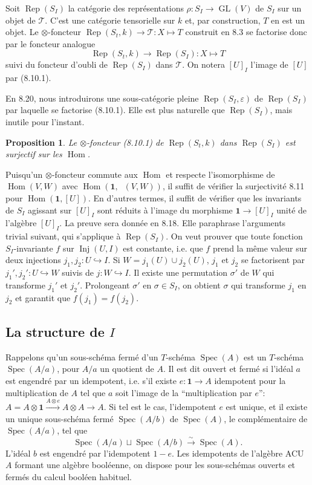 \documentclass[11pt,a4paper]{article}
\theoremstyle{plain}
\newtheorem{proposition}[theorem]{Proposition}
\theoremstyle{definition}
\DeclareMathOperator{\Hom}{Hom}
\DeclareMathOperator{\Spec}{Spec}
\DeclareMathOperator{\Rep}{Rep}
\DeclareMathOperator{\Inj}{Inj}
\DeclareMathOperator{\GL}{GL}
\newcommand{\eps}{\varepsilon}
\newcommand{\isom}{\xrightarrow{\sim}}
\newcommand{\inj}{\hookrightarrow}
\DeclareMathOperator{\iHom}{\underline{Hom}}
\begin{document}
Soit $\Rep(S_I)$ la cat\'egorie des repr\'esentations $\rho : S_I \to \GL(V)$ de $S_I$ sur un objet de $\mathcal{T}$. C'est une cat\'egorie tensorielle sur $k$ et, par construction, $T$ en est un objet. Le $\otimes$-foncteur $\Rep(S_t, k) \to \mathcal{T} : X \longmapsto T$ construit en 8.3 se factorise donc par le foncteur analogue
\begin{equation}
\Rep(S_t, k) \to \Rep(S_I) : X \longmapsto T \tag{8.10.1}
\end{equation}
suivi du foncteur d'oubli de $\Rep(S_I)$ dans $\mathcal{T}$. On notera $[U]_I$ l'image de $[U]$ par (8.10.1).

En 8.20, nous introduirons une sous-cat\'egorie pleine $\Rep(S_I, \eps)$ de $\Rep(S_I)$ par laquelle se factorise (8.10.1). Elle est plus naturelle que $\Rep(S_I)$, mais inutile pour l'instant.

\begin{proposition}
Le $\otimes$-foncteur (8.10.1) de $\Rep(S_t, k)$ dans $\Rep(S_I)$ est surjectif sur les $\Hom$.
\end{proposition}

Puisqu'un $\otimes$-foncteur commute aux $\Hom$ et respecte l'isomorphisme de $\Hom(V, W)$ avec $\Hom(\mathbf{1}, \iHom(V, W))$, il suffit de v\'erifier la surjectivit\'e 8.11 pour $\Hom(\mathbf{1}, [U])$. En d'autres termes, il suffit de v\'erifier que les invariants de $S_I$ agissant sur $[U]_I$ sont r\'eduits \`a l'image du morphisme $\mathbf{1} \to [U]_I$ unit\'e de l'alg\`ebre $[U]_I$. La preuve sera donn\'ee en 8.18. Elle paraphrase l'arguments trivial suivant, qui s'applique \`a $\Rep(S_I)$. On veut prouver que toute fonction $S_I$-invariante $f$ sur $\Inj(U, I)$ est constante, i.e. que $f$ prend la m\^eme valeur sur deux injections $j_1, j_2 : U \inj I$. Si $W = j_1(U) \cup j_2(U)$, $j_1$ et $j_2$ se factorisent par $j_1', j_2' : U \inj W$ suivis de $j : W \inj I$. Il existe une permutation $\sigma'$ de $W$ qui transforme $j_1'$ et $j_2'$. Prolongeant $\sigma'$ en $\sigma \in S_I$, on obtient $\sigma$ qui transforme $j_1$ en $j_2$ et garantit que $f(j_1) = f(j_2)$.

\subsection{La structure de $I$}
Rappelons qu'un sous-sch\'ema ferm\'e d'un $T$-sch\'ema $\Spec(A)$ est un $T$-sch\'ema $\Spec(A/a)$, pour $A/a$ un quotient de $A$. Il est dit ouvert et ferm\'e si l'id\'eal $a$ est engendr\'e par un idempotent, i.e. s'il existe $e : \mathbf{1} \to A$ idempotent pour la multiplication de $A$ tel que $a$ soit l'image de la ``multiplication par $e$'': $A = A \otimes \mathbf{1} \xrightarrow{A \otimes e} A \otimes A \longrightarrow A$. Si tel est le cas, l'idempotent $e$ est unique, et il existe un unique sous-sch\'ema ferm\'e $\Spec(A/b)$ de $\Spec(A)$, le compl\'ementaire de $\Spec(A/a)$, tel que
\[
\Spec(A/a) \sqcup \Spec(A/b) \isom \Spec(A).
\]
L'id\'eal $b$ est engendr\'e par l'idempotent $1 - e$. Les idempotents de l'alg\`ebre ACU $A$ formant une alg\`ebre bool\'eenne, on dispose pour les sous-sch\'emas ouverts et ferm\'es du calcul bool\'een habituel.
\end{document}

